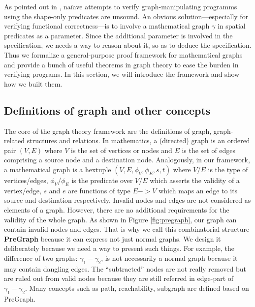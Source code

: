 As pointed out in \cite{hobor:ramification}, na\"iave attempts to
verify graph-manipulating programms using the shape-only predicates
are unsound. An obvious solution---especially for verifying functional
correctness---is to involve a mathematical graph $\gamma$ in spatial
predicates as a parameter. Since the additional parameter is involved
in the specification, we needs a way to reason about it, so as to
deduce the specification. Thus we formalize a general-purpose proof
framework for mathematical graphs and provide a bunch of useful
theorems in graph theory to ease the burden in verifying programs. In
this section, we will introduce the framework and show how we built
them.

\subsection{Definitions of graph and other concepts}
The core of the graph theory framework are the definitions of graph,
graph-related structures and relations. In mathematics, a (directed)
graph is an ordered pair $(V, E)$ where $V$ is the set of vertices or
nodes and $E$ is the set of edges comprising a source node and a
destination node. Analogously, in our framework, a mathematical graph
is a hextuple $(V, E, \phi_V, \phi_E, s, t)$ where $V$/$E$ is the type
of vertices/edges, $\phi_V$/$\phi_E$ is the predicate over $V$/$E$
which asserts the validity of a vertex/edge, $s$ and $e$ are functions
of type $E -> V$ which maps an edge to its source and destination
respectively. Invalid nodes and edges are not considered as elements
of a graph. However, there are no additional requirements for the
validity of the whole graph. As shown in Figure \ref{fig:pregraph},
our graph can contain invalid nodes and edges. That is why we call
this combinatorial structure \textbf{PreGraph} because it can express
not just normal graphs. We design it deliberately because we need a
way to present such things. For example, the difference of two graphs:
$\gamma_1-\gamma_2$, is not necessarily a normal graph because it may
contain dangling edges. The ``subtracted'' nodes are not really
removed but are ruled out from valid nodes because they are still
referred in edge-part of $\gamma_1-\gamma_2$. Many concepts such as
path, reachability, subgraph are defined based on PreGraph.

